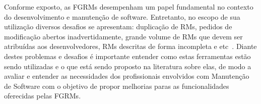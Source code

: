 Conforme exposto, as FGRMs desempenham um papel fundamental no contexto do
desenvolvimento e manutenção de software. Entretanto, no escopo de sua
utilização diversos desafios se apresentam: duplicação de RMs, pedidos de
modificação abertos inadvertidamente, grande volume de RMs que devem ser
atribuídas aos desenvolvedores, RMs descritas de forma incompleta e
etc~\cite{cavalcanti2014challenges}. Diante destes problemas e desafios é
importante entender como estas ferramentas estão sendo utilizadas e o que está
sendo proposto na literatura sobre elas, de modo a avaliar e entender as
necessidades dos profissionais envolvidos com Manutenção de Software com o
objetivo de propor melhorias paras as funcionalidades oferecidas pelas FGRMs.

%
%
%
%

